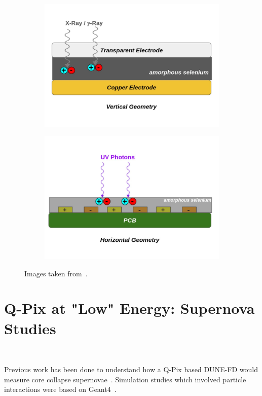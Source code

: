 \begin{figure}
\centering
\begin{subfigure}{.5\textwidth}
  \centering
  \includegraphics[width=\textwidth]{images/qpix_light_vertical_geom.pdf}
  \caption{}
\end{subfigure}%
\begin{subfigure}{.5\textwidth}
  \centering
  \includegraphics[width=\textwidth]{images/qpix_light_horizontal_geom.pdf}
  \caption{}
\end{subfigure}
\caption{Images taken from~\citep{https://doi.org/10.48550/arxiv.2207.11127}.}
\label{fig:qpix_light_geometries}
\end{figure}

\section{Q-Pix at "Low" Energy: Supernova Studies}~\label{sec:supernova}

Previous work has been done to understand how a Q-Pix based DUNE-FD would measure core collapse supernovae~\citep{qpix:shion}.
Simulation studies which involved particle interactions were based on Geant4~\citep{geant4:AGOSTINELLI2003250}.